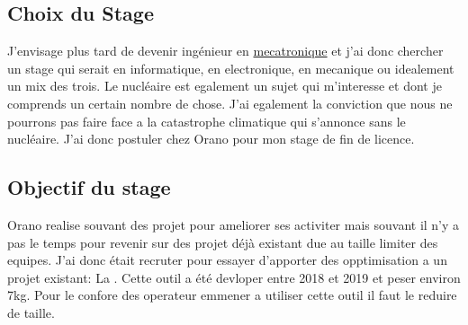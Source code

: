 \subsection{Choix du Stage}
J'envisage plus tard de devenir ingénieur en \href{https://fr.wikipedia.org/wiki/M%C3%A9catronique}{mecatronique} et j'ai donc chercher un stage qui serait en informatique, en electronique, en mecanique ou idealement un mix des trois. Le nucléaire est egalement un sujet qui m'interesse et dont je comprends un certain nombre de chose. J'ai egalement la conviction que nous ne pourrons pas faire face a la catastrophe climatique qui s'annonce sans le nucléaire. J'ai donc postuler chez Orano pour mon stage de fin de licence. 
\subsection{Objectif du stage}

Orano realise souvant des projet pour ameliorer ses activiter mais souvant il n'y a pas le temps pour revenir sur des projet déjà existant due au taille limiter des equipes. J'ai donc était recruter pour essayer d'apporter des opptimisation a un projet existant: La . Cette outil a été devloper entre 2018 et 2019 et peser environ 7kg. Pour le confore des operateur emmener a utiliser cette outil il faut le reduire de taille.